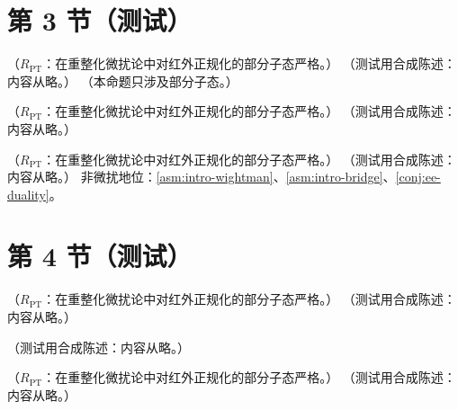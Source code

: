 \section{第 3 节（测试）}\label{sec:ee-euclid}

\begin{theorem}\label{thm:ee-euclid-ir}
（$R_{\mathrm{PT}}$：在重整化微扰论中对红外正规化的部分子态严格。）
（测试用合成陈述：内容从略。）
（本命题只涉及部分子态。）
\end{theorem}

\begin{proposition}\label{prop:ee-adler-rg}
（$R_{\mathrm{PT}}$：在重整化微扰论中对红外正规化的部分子态严格。）
（测试用合成陈述：内容从略。）
\end{proposition}

\begin{theorem}\label{thm:ee-R-finite}
（$R_{\mathrm{PT}}$：在重整化微扰论中对红外正规化的部分子态严格。）
（测试用合成陈述：内容从略。）
非微扰地位：\cref{asm:intro-wightman}、\cref{asm:intro-bridge}、\cref{conj:ee-duality}。
\end{theorem}

\section{第 4 节（测试）}\label{sec:ee-theorem}

\begin{proposition}\label{prop:ee-oneloop}
（$R_{\mathrm{PT}}$：在重整化微扰论中对红外正规化的部分子态严格。）
（测试用合成陈述：内容从略。）
\end{proposition}

\begin{example}\label{ex:ee-quark-spectrum}
（测试用合成陈述：内容从略。）
\end{example}

\begin{proposition}\label{prop:ee-twoloop}
（$R_{\mathrm{PT}}$：在重整化微扰论中对红外正规化的部分子态严格。）
（测试用合成陈述：内容从略。）
\end{proposition}


